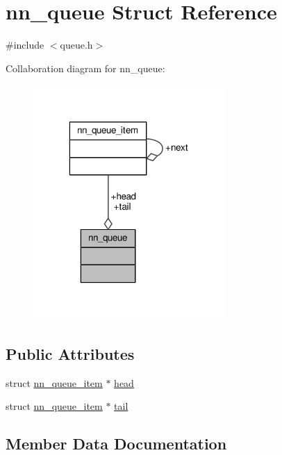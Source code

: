 \hypertarget{structnn__queue}{}\section{nn\+\_\+queue Struct Reference}
\label{structnn__queue}


{\ttfamily \#include $<$queue.\+h$>$}



Collaboration diagram for nn\+\_\+queue\+:\nopagebreak
\begin{figure}[H]
\begin{center}
\leavevmode
\includegraphics[width=208pt]{structnn__queue__coll__graph}
\end{center}
\end{figure}
\subsection*{Public Attributes}
\begin{DoxyCompactItemize}
\item 
struct \hyperlink{structnn__queue__item}{nn\+\_\+queue\+\_\+item} $\ast$ \hyperlink{structnn__queue_a3e9e8719559c09cbf465aba2f53f18cd}{head}
\item 
struct \hyperlink{structnn__queue__item}{nn\+\_\+queue\+\_\+item} $\ast$ \hyperlink{structnn__queue_ae32a4da4bc53162492eba90840b5c106}{tail}
\end{DoxyCompactItemize}


\subsection{Member Data Documentation}
